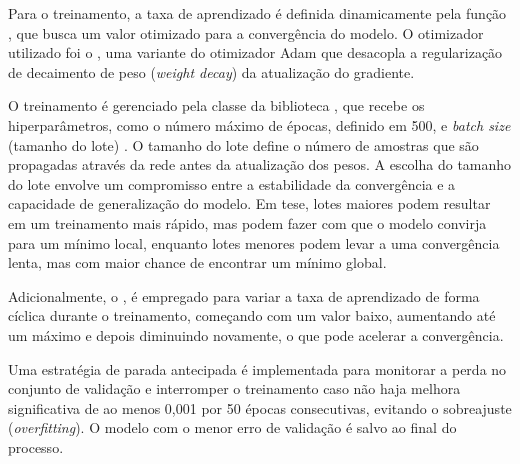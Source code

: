 Para o treinamento, a taxa de aprendizado  é definida dinamicamente pela função , 
que busca um valor otimizado para a convergência do modelo. O otimizador utilizado foi o , uma variante do otimizador 
Adam que desacopla a regularização de decaimento de peso (\textit{weight decay}) da atualização do gradiente.

O treinamento é gerenciado pela classe  da biblioteca , que recebe os hiperparâmetros, 
como o número máximo de épocas, definido em 500, e \textit{batch size} (tamanho do lote) . O tamanho
do lote define o número de amostras que são propagadas através da rede antes da atualização dos pesos. A escolha do tamanho
do lote envolve um compromisso entre a estabilidade da convergência e a capacidade de generalização do modelo. Em tese, 
lotes maiores podem resultar em um treinamento mais rápido, mas podem fazer com que o modelo convirja para um mínimo local, 
enquanto lotes menores podem levar a uma convergência lenta, mas com maior chance de encontrar um mínimo global.

Adicionalmente, o , é empregado para variar a taxa de aprendizado de forma cíclica durante o treinamento, 
começando com um valor baixo, aumentando até um máximo e depois diminuindo novamente, o que pode acelerar a convergência.

Uma estratégia de parada antecipada  é implementada para monitorar a perda no conjunto de validação 
e interromper o treinamento caso não haja melhora significativa de ao menos 0,001 por 50 épocas consecutivas, 
evitando o sobreajuste (\textit{overfitting}). O modelo com o menor erro de validação é salvo ao final do processo.